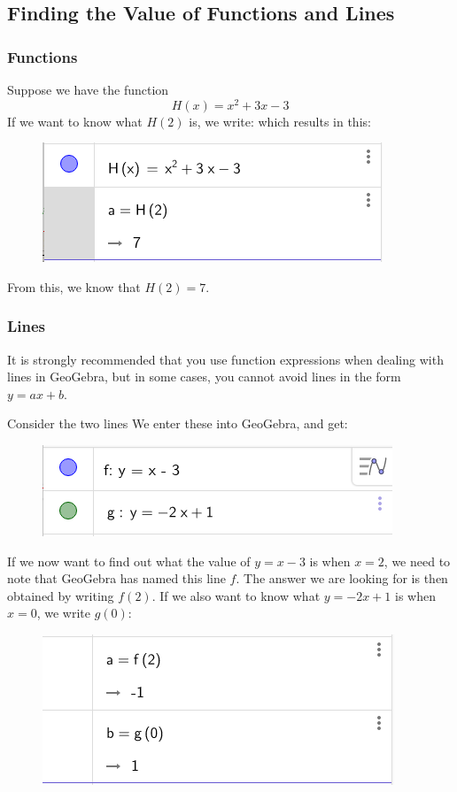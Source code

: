 \subsection{Finding the Value of Functions and Lines}
\subsubsection{Functions}
Suppose we have the function
\[H(x) = x^2 + 3x -3 \]
If we want to know what \(H(2)\) is, we write:
which results in this:
\begin{figure}[H]
	\centering
	\includegraphics[scale=0.5]{H}
\end{figure}
From this, we know that \(H(2) = 7\).
\subsubsection{Lines}
It is strongly recommended that you use function expressions when dealing with lines in GeoGebra, but in some cases, you cannot avoid lines in the form \(y = ax + b\). \vsk

Consider the two lines \vs
{}
We enter these into GeoGebra, and get:
\begin{figure}[H]
	\centering
	\includegraphics[scale=0.5]{fglin1}
\end{figure}
If we now want to find out what the value of \(y = x-3\) is when \(x = 2\), we need to note that GeoGebra has named this line \(f\). The answer we are looking for is then obtained by writing \(f(2)\). If we also want to know what \(y = -2x+1\) is when \(x = 0\), we write \(g(0)\):
\begin{figure}[H]
	\centering
	\includegraphics[scale=0.6]{fglin2}
\end{figure}


